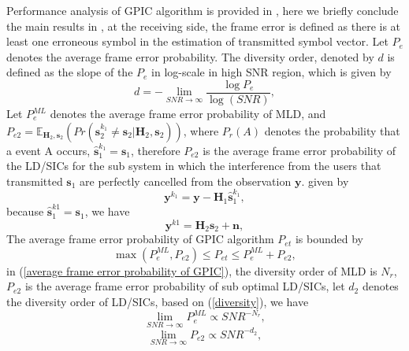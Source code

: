 \documentclass[12pt, draftclsnofoot, onecolumn]{IEEEtran}
\begin{document}
Performance analysis of GPIC algorithm is provided in \cite{radji2009interference}, here we briefly conclude the main results in \cite{radji2009interference}, at the receiving side, the frame error is defined as there is at least one erroneous symbol in the estimation of transmitted symbol vector. Let $P_{e}$ denotes the average frame error probability. The diversity order, denoted by $d$ is defined as the slope of the $P_{e}$ in log-scale in high SNR region, which is given by\cite{zheng2003diversity}
\begin{equation}
d=-\lim_{SNR\to\infty}\frac{\log{P_{e}}}{\log(SNR)},
\label{diversity}
\end{equation}
Let $P_{e}^{ML}$ denotes the average frame error probability of MLD, and $P_{e2}=\mathbb{E}_{\mathbf{H}_{2}, \mathbf{s}_{2}}(Pr(\hat{\mathbf{s}}^{k_{1}}_{2}\neq \mathbf{s}_{2}|\mathbf{H}_{2}, \mathbf{s}_{2}))$, where $P_{r}(A)$ denotes the probability that a event A occurs, $\hat{\mathbf{s}}_{1}^{k_{1}}=\mathbf{s}_{1}$, therefore $P_{e2}$ is the average frame error probability of the LD/SICs for the sub system in which the interference from the users that transmitted $\mathbf{s}_{1}$ are perfectly cancelled from the observation $\mathbf{y}$. given by
\begin{equation}
\mathbf{y}^{k_{1}}=\mathbf{y}-\mathbf{H}_{1}\hat{\mathbf{s}}_{1}^{k_{1}},
\label{perfect IC}
\end{equation} 
because $\hat{\mathbf{s}}^{k1}_{1}=\mathbf{s}_{1}$, we have
\begin{equation}
\mathbf{y}^{k1}=\mathbf{H}_{2}\mathbf{s}_{2}+\mathbf{n},
\label{sub MIMO system}
\end{equation} 
The average frame error probability of GPIC algorithm $P_{et}$ is bounded by 
\begin{equation}
\max(P^{ML}_{e}, P_{e2})\leq P_{et}\leq P^{ML}_{e}+P_{e2}, 
\label{average frame error probability of GPIC}
\end{equation}
in (\ref{average frame error probability of GPIC}), the diversity order of MLD is $N_{r}$, $P_{e2}$ is the average frame error probability of sub optimal LD/SICs, let $d_{2}$ denotes the diversity order of LD/SICs, based on (\ref{diversity}), we have 
\begin{equation}
\lim_{SNR\to\infty}P^{ML}_{e}\propto SNR^{-N_{r}},
\label{MLD diversity}
\end{equation}
\begin{equation}
\lim_{SNR\to\infty}P_{e2}\propto SNR^{-d_{2}},
\label{LD diversity}
\end{equation}
\end{document}
